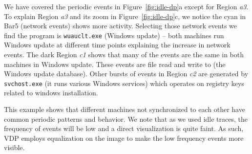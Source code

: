 We have covered the periodic events in Figure~\ref{fig:idle-dp}a except
for Region {\em a3}.
To explain Region {\em a3} and its zoom in Figure~\ref{fig:idle-dp}c,
we notice the cyan in Bar5 (network events) shows more activity.
Selecting those network events we find the
program is {\tt wuauclt.exe} (Windows update) --
both machines run Windows update at different time points explaining
the increase in network events.
The dark Region {\em c1} shows that many of the events are the same 
in both machines in Windows update.
These events are file read and write to
(the Windows update database).
Other bursts of events in Region {\em c2} are generated by
{\tt svchost.exe} (it runs various Windows services) 
which operates on registry keys related to
windows installation.

This example shows that different machines not synchronized to 
each other have common periodic patterns and behavior.
We note that as we used idle traces, the frequency
of events will be low and a direct visualization is quite
faint. As such, VDP employs equalization on the image 
to make the low frequency events more visible.

